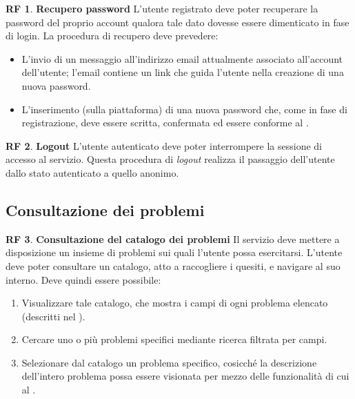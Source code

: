 \documentclass[11pt, a4paper]{article}
\theoremstyle{definition}
\newtheorem{funcreq}{RF} %
\begin{document}
\begin{funcreq}
\label{savepassword}
\textbf{Recupero password }
L'utente registrato deve poter recuperare la password del proprio account
qualora tale dato dovesse essere dimenticato in fase di login. La procedura
di recupero deve prevedere:
\begin{itemize}
    \item L'invio di un messaggio all'indirizzo email attualmente associato
    all'account dell'utente; l'email contiene un link che guida l'utente
    nella creazione di una nuova password.

    \item L'inserimento (sulla piattaforma) di una nuova password che,
    come in fase di registrazione, deve essere scritta, confermata ed essere
    conforme al \textcolor{blue}{}.
\end{itemize}
\end{funcreq}

\begin{funcreq}
\label{logout}
\textbf{Logout }
L'utente autenticato deve poter interrompere la sessione di accesso
al servizio. Questa procedura di \textit{logout} realizza il passaggio dell'utente
dallo stato autenticato a quello anonimo.
\end{funcreq}

\subsection{Consultazione dei problemi}

\begin{funcreq}
\label{probcatalogue}
\textbf{Consultazione del catalogo dei problemi }
Il servizio deve mettere a disposizione un insieme di problemi sui quali
l'utente possa esercitarsi. L'utente deve poter consultare un catalogo,
atto a raccogliere i quesiti, e navigare al suo interno. Deve quindi
essere possibile:
\begin{enumerate}
    \item Visualizzare tale catalogo, che mostra i campi di ogni problema
    elencato (descritti nel \textcolor{blue}{}).
    
    \item Cercare uno o più problemi specifici mediante ricerca filtrata
    per campi.

    \item Selezionare dal catalogo un problema specifico, cosicché la
    descrizione dell'intero problema possa essere visionata per mezzo
    delle funzionalità di cui al \textcolor{blue}{}.
\end{enumerate}
\end{funcreq}
\end{document}
